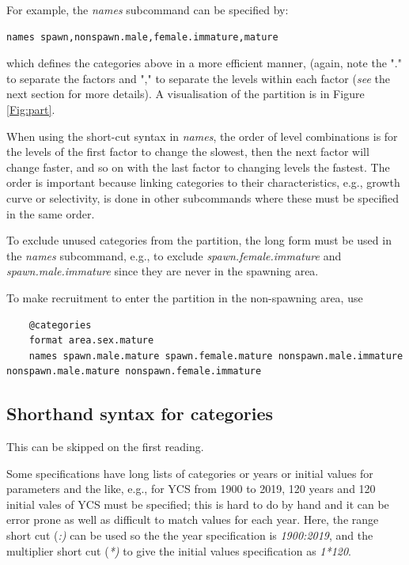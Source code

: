For example, the \textit{names} subcommand can be specified by:

{\small{\begin{verbatim}names spawn,nonspawn.male,female.immature,mature
\end{verbatim}}}

which defines the categories above in a more efficient manner, (again, note the "." to separate the factors and "," to separate the levels within each factor (\textit{see} the next section for more details). A visualisation of the partition is in Figure \ref{Fig:part}.

When using the short-cut syntax in \textit{names}, the order of level combinations is for the levels of the first factor to change the slowest, then the next factor will change faster, and so on with the last factor to changing levels the fastest. The order is important because linking categories to their characteristics, e.g., growth curve or selectivity, is done in other subcommands where these must be specified in the same order.

To exclude unused categories from the partition, the long form must be used in the \textit{names} subcommand, e.g., to exclude  \textit{spawn.female.immature} and \textit{spawn.male.immature} since they are never in the spawning area.

To make recruitment to enter the partition in  the non-spawning area, use

{\small{\begin{lstlisting}
	@categories
	format area.sex.mature
	names spawn.male.mature spawn.female.mature nonspawn.male.immature nonspawn.male.mature nonspawn.female.immature
\end{lstlisting}}}

\subsection{Shorthand syntax for categories}\label{sec:ShorthandSyntax}

This can be skipped on the first reading.

Some specifications have long lists of categories or years or initial values for parameters and the like, e.g., for YCS from 1900 to 2019, 120 years and 120 initial vales of YCS must be specified; this is hard to do by hand and it can be error prone as well as difficult to match values for each year. Here, the range short cut (\textit{:)} can be used so the  the year specification is \textit{1900:2019}, and the multiplier short cut (\textit{*)} to give the initial values specification as \textit{1*120}.

